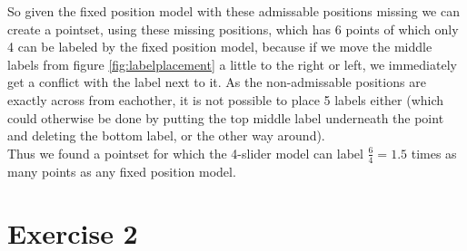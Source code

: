 \documentclass[a4paper,11pt]{article}
\begin{document}
So given the fixed position model with these admissable positions missing we can create a pointset, using these missing positions, which has 6 points of which only 4 can be labeled by the fixed position model, because if we move the middle labels from figure \ref{fig:labelplacement} a little to the right or left, we immediately get a conflict with the label next to it. As the non-admissable positions are exactly across from eachother, it is not possible to place 5 labels either (which could otherwise be done by putting the top middle label underneath the point and deleting the bottom label, or the other way around).\\

Thus we found a pointset for which the 4-slider model can label $\frac{6}{4} = 1.5$ times as many points as any fixed position model.


\section*{Exercise 2}
\end{document}
